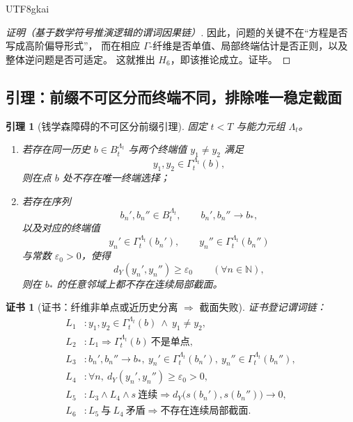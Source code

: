 \documentclass[12pt]{article}
\newtheorem{lemma}{引理}[section]
\newtheorem{Certificate}{证书}[section]
\newcommand{\NN}{\mathbb{N}}
\begin{document}
\begin{CJK*}{UTF8}{gkai}
\begin{proof}[证明（基于数学符号推演逻辑的谓词因果链）]
因此，问题的关键不在“方程是否写成高阶偏导形式”，
而在相应 \(\Gamma\)-纤维是否单值、局部终端估计是否正则，以及整体逆问题是否可适定。
这就推出 \(H_6\)，即该推论成立。证毕。
\end{proof}

\subsection{引理：前缀不可区分而终端不同，排除唯一稳定截面}
\label{subsec:tex1-ch1-lemma}

\begin{lemma}[钱学森障碍的不可区分前缀引理]
\label{lem:tex1-indistinguishable-prefix}
固定 $t<T$ 与能力元组 $\Lambda_t$。
\begin{enumerate}
  \item 若存在同一历史 $b\in B_t^{\Lambda_t}$ 与两个终端值 $y_1\neq y_2$ 满足
  \[
    y_1,y_2\in \Gamma_t^{\Lambda_t}(b),
  \]
  则在点 $b$ 处不存在唯一终端选择；
  \item 若存在序列
  \[
    b_n',b_n''\in B_t^{\Lambda_t},
    \qquad
    b_n',b_n''\to b_\ast,
  \]
  以及对应的终端值
  \[
    y_n'\in \Gamma_t^{\Lambda_t}(b_n'),
    \qquad
    y_n''\in \Gamma_t^{\Lambda_t}(b_n'')
  \]
  与常数 $\varepsilon_0>0$，使得
  \[
    d_Y(y_n',y_n'')\ge \varepsilon_0
    \qquad
    (\forall n\in\NN),
  \]
  则在 $b_\ast$ 的任意邻域上都不存在连续局部截面。
\end{enumerate}
\end{lemma}

\begin{Certificate}[证书：纤维非单点或近历史分离 $\Rightarrow$ 截面失败]
\label{cert:tex1-indistinguishable-prefix}
证书登记谓词链：
\[
\begin{aligned}
  L_1 &: y_1,y_2\in \Gamma_t^{\Lambda_t}(b)\ \wedge\ y_1\neq y_2,\\
  L_2 &: L_1\Rightarrow \Gamma_t^{\Lambda_t}(b)\ \text{不是单点},\\
  L_3 &: b_n',b_n''\to b_\ast,\ y_n'\in \Gamma_t^{\Lambda_t}(b_n'),\ y_n''\in \Gamma_t^{\Lambda_t}(b_n''),\\
  L_4 &: \forall n,\ d_Y(y_n',y_n'')\ge \varepsilon_0>0,\\
  L_5 &: L_3\wedge L_4\wedge s\ \text{连续}
        \Rightarrow d_Y\bigl(s(b_n'),s(b_n'')\bigr)\to 0,\\
  L_6 &: L_5\ \text{与}\ L_4\ \text{矛盾}
        \Rightarrow \text{不存在连续局部截面}.
\end{aligned}
\]
\end{Certificate}


\end{CJK*}
\end{document}
